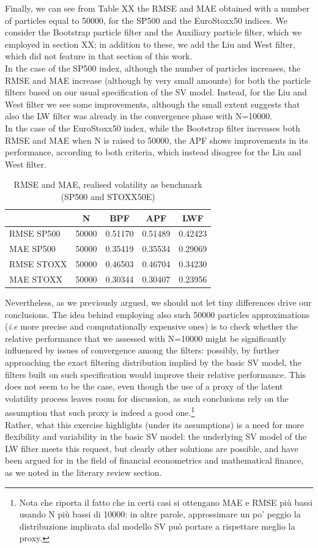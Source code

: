 \documentclass[
]{book}
\theoremstyle{break}
\theoremstyle{nonumberplain}
\begin{document}
Finally, we can see from Table XX the RMSE and MAE obtained with a
number of particles equal to 50000, for the SP500 and the EuroStoxx50
indices. We consider the Bootstrap particle filter and the Auxiliary
particle filter, which we employed in section XX; in addition to these,
we add the Liu and West filter, which did not feature in that section of
this work.\\
In the case of the SP500 index, although the number of particles
increases, the RMSE and MAE increase (although by very small amounts)
for both the particle filters based on our usual specification of the SV
model. Instead, for the Liu and West filter we see some improvements,
although the small extent suggests that also the LW filter was already
in the convergence phase with N=10000.\\
In the case of the EuroStoxx50 index, while the Bootstrap filter
increases both RMSE and MAE when N is raised to 50000, the APF shows
improvements in its performance, according to both criteria, which
instead disagree for the Liu and West filter.

\begin{longtable}[t]{lcccc}
\caption{\label{tab:unnamed-chunk-50}RMSE and MAE, realised volatility as benchmark (SP500 and STOXX50E)}\\
\toprule
  & N & BPF & APF & LWF\\
\midrule
RMSE SP500 & 50000 & 0.51170 & 0.51489 & 0.42423\\
MAE SP500 & 50000 & 0.35419 & 0.35534 & 0.29069\\
RMSE STOXX & 50000 & 0.46503 & 0.46704 & 0.34230\\
MAE STOXX & 50000 & 0.30344 & 0.30407 & 0.23956\\
\bottomrule
\end{longtable}

Nevertheless, as we previously argued, we should not let tiny
differences drive our conclusions. The idea behind employing also such
50000 particles approximations (\textit{i.e} more precise and
computationally expensive ones) is to check whether the relative
performance that we assessed with N=10000 might be significantly
influenced by issues of convergence among the filters: possibly, by
further approaching the exact filtering distribution implied by the
basic SV model, the filters built on such specification would improve
their relative performance. This does not seem to be the case, even
though the use of a proxy of the latent volatility process leaves room
for discussion, as such conclusions rely on the assumption that such
proxy is indeed a good
one.\footnote{Nota che riporta il fatto che in certi casi si ottengano MAE e RMSE più bassi usando N più bassi di 10000: in altre parole, approssimare un po' peggio la distribuzione implicata dal modello SV può portare a rispettare meglio la proxy.}\\
Rather, what this exercise highlights (under its assumptions) is a need
for more flexibility and variability in the basic SV model: the
underlying SV model of the LW filter meets this request, but clearly
other solutions are possible, and have been argued for in the field of
financial econometrics and mathematical finance, as we noted in the
literary review section.
\end{document}
